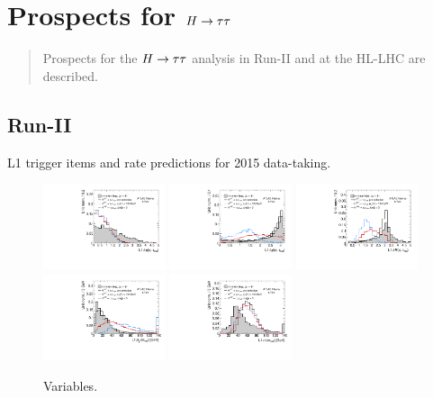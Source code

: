 \chapter[Prospects for $\Htautau$][Prospects for $\Htautau$]{Prospects for $\Htautau$}
\label{chap:prospects}

\begin{quote}
Prospects for the $\Htautau$ analysis in Run-II and at the HL-LHC are described.
\end{quote}

\section{Run-II}
\label{sec:prospects-run2}

\begin{table}[bp] 
  \centering
  \caption{L1 trigger items and rate predictions for 2015 data-taking.}
  
  \label{tab:prospects-L1rate-evolution}
\end{table}

\begin{figure}[tp]
  \centering
  \includegraphics[width=0.32\textwidth]{figures/l1topo/taulep-deta}
  \includegraphics[width=0.32\textwidth]{figures/l1topo/taulep-dphi}
  \includegraphics[width=0.32\textwidth]{figures/l1topo/taulep-dR}
  \includegraphics[width=0.32\textwidth]{figures/l1topo/ditau-pt}
  \includegraphics[width=0.32\textwidth]{figures/l1topo/ditau-m}
  \caption{Variables.}
  \label{fig:prospects-trigger-l1topo-angular}
\end{figure}

